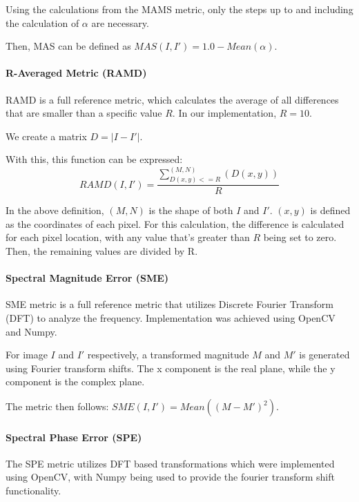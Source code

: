\documentclass[12pt,a4paper]{article}
\begin{document}
            Using the calculations from the MAMS metric, only the steps up to and including the calculation of $\alpha$ are necessary. 

            Then, MAS can be defined as $MAS(I, I') = 1.0 - Mean(\alpha)$.

            \paragraph{R-Averaged Metric (RAMD)}
                RAMD is a full reference metric, which calculates the average of all differences that are smaller than a specific value $R$.
                In our implementation, $R=10$.

                We create a matrix $D = |I - I'|$.

                With this, this function can be expressed: $$RAMD(I, I') = \frac{\sum_{D(x, y) <= R}^{(M, N)}(D(x, y))}{R}$$

                In the above definition, $(M, N)$ is the shape of both $I$ and $I'$. $(x, y)$ is defined as the coordinates of each pixel. For this calculation,
                the difference is calculated for each pixel location, with any value that's greater than $R$ being set to zero. Then, the remaining values are divided by R.

            \paragraph{Spectral Magnitude Error (SME)}
                SME metric is a full reference metric that utilizes Discrete Fourier Transform (DFT) to analyze the frequency.
                Implementation was achieved using OpenCV and Numpy.

                For image $I$ and $I'$ respectively, a transformed magnitude $M$ and $M'$ is generated using Fourier transform shifts.
                The x component is the real plane, while the y component is the complex plane.

                The metric then follows: $SME(I, I') = Mean((M - M')^2)$.
             
            \paragraph{Spectral Phase Error (SPE)}
                The SPE metric utilizes DFT based transformations which were implemented using OpenCV, with Numpy being used to provide the fourier transform shift functionality.
\end{document}
